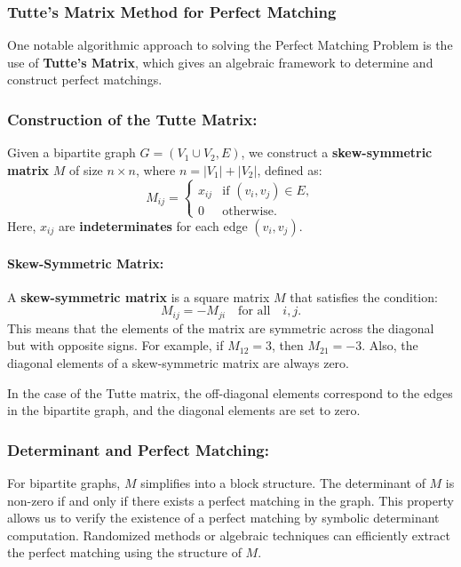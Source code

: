 \subsubsection{Tutte's Matrix Method for Perfect Matching}

One notable algorithmic approach to solving the Perfect Matching Problem is the use of \textbf{Tutte's Matrix}, which gives an algebraic framework to determine and construct perfect matchings.\cite{yadav2023advanced, Geelen2000}

\subsubsection*{Construction of the Tutte Matrix:}

Given a bipartite graph $G = (V_1 \cup V_2, E)$, we construct a \textbf{skew-symmetric matrix} $M$ of size $n \times n$, where $n = |V_1| + |V_2|$, defined as:
\[
M_{ij} = 
\begin{cases} 
x_{ij} & \text{if } (v_i, v_j) \in E, \\
0 & \text{otherwise}.
\end{cases}
\]
Here, $x_{ij}$ are \textbf{indeterminates} for each edge $(v_i, v_j)$. 

\paragraph{Skew-Symmetric Matrix:} A \textbf{skew-symmetric matrix} is a square matrix $M$ that satisfies the condition:
\[
M_{ij} = -M_{ji} \quad \text{for all} \quad i, j.
\]
This means that the elements of the matrix are symmetric across the diagonal but with opposite signs. For example, if $M_{12} = 3$, then $M_{21} = -3$. Also, the diagonal elements of a skew-symmetric matrix are always zero.

In the case of the Tutte matrix, the off-diagonal elements correspond to the edges in the bipartite graph, and the diagonal elements are set to zero.

\subsubsection*{Determinant and Perfect Matching:}
For bipartite graphs, $M$ simplifies into a block structure. The determinant of $M$ is non-zero if and only if there exists a perfect matching in the graph. This property allows us to verify the existence of a perfect matching by symbolic determinant computation. Randomized methods or algebraic techniques can efficiently extract the perfect matching using the structure of $M$.

